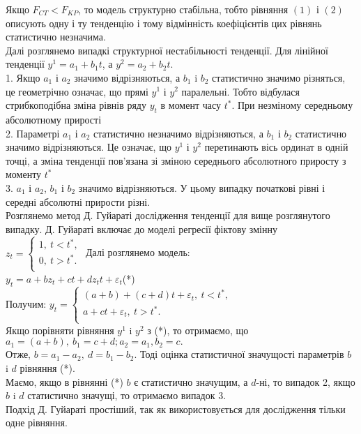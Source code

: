 \documentclass[a4paper,12pt]{article}
\begin{document}
Якщо $F_{CT}<F_{KP}$, то модель структурно стабільна, тобто рівняння $(1)$ і $(2)$ описують одну і ту тенденцію і тому відмінність коефіцієнтів цих рівнянь статистично незначима.\\
Далі розглянемо випадкі структурної нестабільності тенденції. Для лінійної тенденції  $y^1=a_1+b_1t $, а $ y^2=a_2+b_2t $.\\
1. Якщо $a_1$ і $a_2$ значимо відрізняються, а $b_1$ i $b_2$ статистично значимо різняться, це геометрічно означає, що прямі $y^1$ і $y^2$ паралельні. Тобто відбулася стрибкоподібна зміна рівнів ряду $y_t$ в момент часу $t^*$. При незміному середньому абсолютному прирості\\
2. Параметрі $a_1$ і $a_2$ статистично незначимо відрізняються, а $b_1$ і $b_2$ статистично значимо відрізняються. Це означає, що $y^1$ і $y^2$ перетинають вісь ординат в одній точці, а зміна тенденції пов'язана зі зміною середнього абсолютного приросту з моменту $t^*$\\
3. $a_1$ і $a_2$, $b_1$ і $b_2$ значимо відрізняються. У цьому випадку початкові рівні і середні абсолютні прирости різні.\\
Розглянемо метод Д. Гуйараті дослідження тенденції для вище розглянутого випадку. Д. Гуйараті включає до моделі регресії  фіктову змінну $z_t=\begin{cases}1,\: t<t^*,\\
0,\: t>t^*.\\
\end{cases}
$
Далі розглянемо модель:\\
$y_t=a+bz_t+ct+dz_tt+\varepsilon_t$(*)\\
Получим: $y_t=\begin{cases}(a+b)+(c+d)t+\varepsilon_t,\: t<t^*,\\
a+ct+\varepsilon_t,\: t>t^*.\\
\end{cases}
$\\
Якщо порівняти рівняння $y^1$ i $y^2$ з (*), то отримаємо, що $a_1 =(a+b),\: b_1=c+d; a_2=a_1, b_2=c.$\\
Отже, $b=a_1-a_2,\: d=b_1-b_2$. Тоді оцінка статистичної значущості параметрів $b$ i $d$ рівняння (*).\\
Маємо, якщо в рівнянні (*) $b$ є статистично значущим, а $d$-ні, то випадок 2, якщо $b$ i $d$ статистично значущі, то отримаємо випадок 3.\\
Подхід Д. Гуйараті простіший, так як використовується для дослідження тільки одне рівняння.\\
\end{document}
